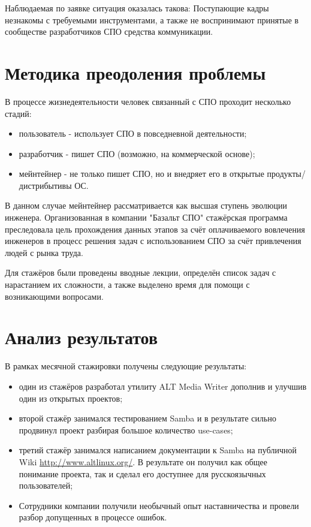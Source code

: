Наблюдаемая по заявке ситуация оказалась такова: Поступающие кадры
незнакомы с требуемыми инструментами, а также не воспринимают принятые
в сообществе разработчиков СПО средства коммуникации.

\section{Методика преодоления проблемы}

В процессе жизнедеятельности человек связанный с СПО проходит несколько
стадий:

\begin{itemize}
\item пользователь - использует СПО в повседневной деятельности;
\item разработчик - пишет СПО (возможно, на коммерческой основе);
\item мейнтейнер - не только пишет СПО, но и внедряет его в открытые
продукты/дистрибытивы ОС.
\end{itemize}

В данном случае мейнтейнер рассматривается как высшая ступень эволюции
инженера. Организованная в компании "Базальт СПО" стажёрская программа
преследовала цель прохождения данных этапов за счёт оплачиваемого
вовлечения инженеров в процесс решения задач с использованием СПО за
счёт привлечения людей с рынка труда.

Для стажёров были проведены вводные лекции, определён список задач с
нарастанием их сложности, а также выделено время для помощи с
возникающими вопросами.


\section{Анализ результатов}

В рамках месячной стажировки получены следующие результаты:

\begin{itemize}
\item один из стажёров разработал утилиту ALT Media Writer дополнив и
улучшив один из открытых проектов;
\item второй стажёр занимался тестированием Samba и в результате сильно
продвинул проект разбирая большое количество use-cases;
\item третий стажёр занимался написанием документации к Samba на публичной
Wiki \url{http://www.altlinux.org/}. В результате он получил как
общее понимание проекта, так и сделал его доступнее для русскоязычных 
пользователей;
\item Сотрудники компании получили необычный опыт наставничества и
провели разбор допущенных в процессе ошибок.
\end{itemize}

